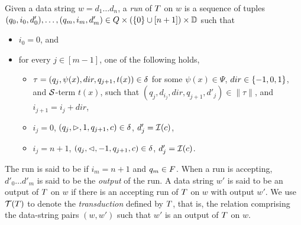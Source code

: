 Given a data string $w = d_1 \dots d_n$, a \emph{run} of $T$ on $w$
is a sequence of tuples $(q_0, i_0, d'_0), \ldots, (q_m, i_m, d'_m) \in Q \times (\{0\} \cup [n+1]) \times \mathbb{D}$ 
such that
\begin{itemize}
    \item $i_0 = 0$, and
    \item for every $j \in [m-1]$, one of the following holds,
    \begin{itemize}
  	\item  $\tau=(q_j, \psi(x), dir, q_{j+1}, t(x)) \in \delta$ for some $\psi(x) \in \Psi$, $dir \in \{-1, 0, 1\}$, and $\mathcal{S}$-term $t(x)$, such that $(q_j, d_{i_j}, dir, q_{j+1}, d'_j) \in \|\tau\|$, and $i_{j+1} = i_j + dir$,
	\item $i_j = 0$, $(q_j, \vartriangleright, 1, q_{j+1}, c) \in \delta$, $d'_j = \mathcal{I}(c)$,
	\item $i_j = n+1$, $(q_j, \vartriangleleft, -1, q_{j+1}, c) \in \delta$, $d'_j = \mathcal{I}(c)$.
  \end{itemize}
\end{itemize}
The run is said to be  if $i_m = n+1$ and $q_m \in F$. When a run is accepting, $d'_0 \ldots d'_m$ is said to be the \emph{output} of the run.
A data string $w'$ is said to be an output of $T$ on $w$ if there is an accepting run of
$T$ on $w$ with output $w'$. We use $\mathcal{T}(T)$ to denote the \emph{transduction} defined by $T$, that is, the relation comprising the data-string pairs $(w, w')$ such that $w'$ is an output of $T$ on $w$.



